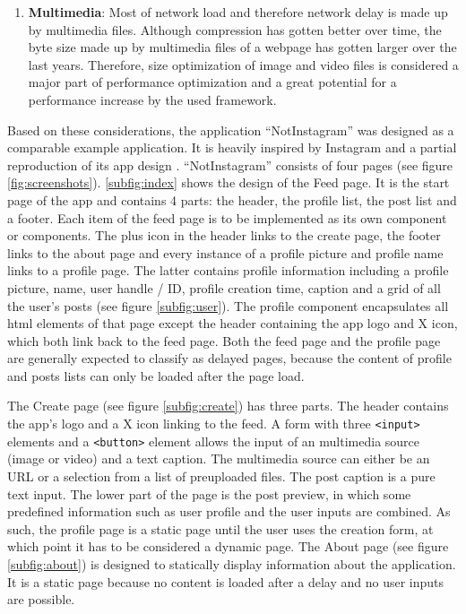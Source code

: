 \documentclass[a4paper, 12pt]{article}
\begin{document}
\begin{enumerate}
  \item \textbf{Multimedia}: Most of network load and therefore network delay is made up by multimedia files. %
  Although compression has gotten better over time, the byte size made up by multimedia files of a webpage has gotten larger over the last years. %
  Therefore, size optimization of image and video files is considered a major part of performance optimization and a great potential for a performance increase by the used framework.

\end{enumerate}

Based on these considerations, the application \enquote{NotInstagram} was designed as a comparable example application.
It is heavily inspired by Instagram and a partial reproduction of its app design \citep{instagram}.
\enquote{NotInstagram} consists of four pages (see figure \ref{fig:screenshots}).
\ref{subfig:index} shows the design of the Feed page.
It is the start page of the app and contains 4 parts: the header, the profile list, the post list and a footer.
Each item of the feed page is to be implemented as its own component or components.
The plus icon in the header links to the create page, the footer links to the about page and every instance of a profile picture and profile name links to a profile page.
The latter contains profile information including a profile picture, name, user handle / ID, profile creation time, caption and a grid of all the user's posts (see figure \ref{subfig:user}).
The profile component encapsulates all \acrshort{html} elements of that page except the header containing the app logo and X icon, which both link back to the feed page.
Both the feed page and the profile page are generally expected to classify as delayed pages, because the content of profile and posts lists can only be loaded after the page load.

The Create page (see figure \ref{subfig:create}) has three parts.
The header contains the app's logo and a X icon linking to the feed.
A form with three \verb|<input>| elements and a \verb|<button>| element allows the input of an multimedia source (image or video) and a text caption.
The multimedia source can either be an URL or a selection from a list of preuploaded files.
The post caption is a pure text input.
The lower part of the page is the post preview, in which some predefined information such as user profile and the user inputs are combined.
As such, the profile page is a static page until the user uses the creation form, at which point it has to be considered a dynamic page.
The About page (see figure \ref{subfig:about}) is designed to statically display information about the application.
It is a static page because no content is loaded after a delay and no user inputs are possible.
\end{document}
